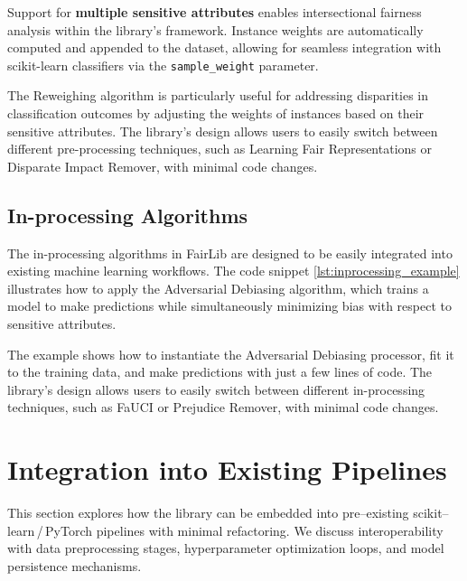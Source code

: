 \documentclass[12pt,a4paper,openright,twoside]{book}
\begin{document}


Support for \textbf{multiple sensitive attributes} enables intersectional fairness analysis within the library’s framework. Instance weights are automatically computed and appended to the dataset, allowing for seamless integration with scikit-learn classifiers via the \texttt{sample\_weight} parameter.

The Reweighing algorithm is particularly useful for addressing disparities in classification outcomes by adjusting the weights of instances based on their sensitive attributes. The library's design allows users to easily switch between different pre-processing techniques, such as Learning Fair Representations or Disparate Impact Remover, with minimal code changes.

\subsection{In-processing Algorithms}
The in-processing algorithms in FairLib are designed to be easily integrated into existing machine learning workflows. The code snippet \ref{lst:inprocessing_example} illustrates how to apply the Adversarial Debiasing algorithm, which trains a model to make predictions while simultaneously minimizing bias with respect to sensitive attributes.



The example shows how to instantiate the Adversarial Debiasing processor, fit it to the training data, and make predictions with just a few lines of code. The library's design allows users to easily switch between different in-processing techniques, such as FaUCI or Prejudice Remover, with minimal code changes.


\section{Integration into Existing Pipelines}
This section explores how the library can be embedded into pre--existing scikit--learn\,/\,PyTorch pipelines with minimal refactoring. We discuss interoperability with data preprocessing stages, hyperparameter optimization loops, and model persistence mechanisms.
\end{document}
